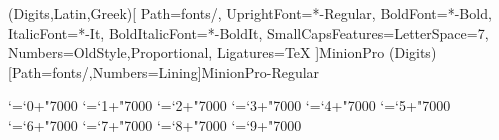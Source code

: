 \usepackage[MnSymbol]{mathspec}
\normalizevarforms

\setallmainfonts(Digits,Latin,Greek)[
	Path=fonts/,
	UprightFont=*-Regular,
	BoldFont=*-Bold,
	ItalicFont=*-It,
	BoldItalicFont=*-BoldIt,
	SmallCapsFeatures={LetterSpace=7},
	Numbers={OldStyle,Proportional},
	Ligatures=TeX
]{MinionPro}
\setmathsfont(Digits)[Path=fonts/,Numbers=Lining]{MinionPro-Regular}

\setsansfont[
	Path=fonts/,
	UprightFont=*-Reg,
	BoldFont=*-Bol,
	ItalicFont=*-Ita,
	BoldItalicFont=*-BolIta
]{URWClassico}

\setmonofont[
	Path=fonts/,
	BoldFont=VeraMoBd,
	ItalicFont=VeraMoIt,
	BoldItalicFont=VeraMoBI,
	Scale=MatchLowercase
]{VeraMono}

\mathcode`\0=\numexpr\mathcode`0+"7000\relax
\mathcode`\1=\numexpr\mathcode`1+"7000\relax
\mathcode`\2=\numexpr\mathcode`2+"7000\relax
\mathcode`\3=\numexpr\mathcode`3+"7000\relax
\mathcode`\4=\numexpr\mathcode`4+"7000\relax
\mathcode`\5=\numexpr\mathcode`5+"7000\relax
\mathcode`\6=\numexpr\mathcode`6+"7000\relax
\mathcode`\7=\numexpr\mathcode`7+"7000\relax
\mathcode`\8=\numexpr\mathcode`8+"7000\relax
\mathcode`\9=\numexpr\mathcode`9+"7000\relax

\newfontface{}
\renewcommand{\textopenbullet}{{\missingsymbol ○}}  %
\renewcommand{\partial}{\text{∂}}

\newfontface{}  %
\newfontfamily{}  %
